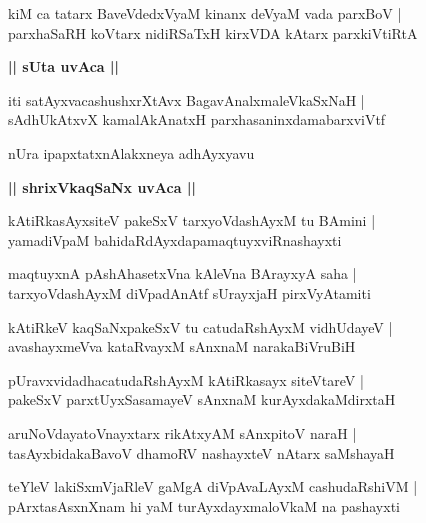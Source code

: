 \documentclass[twoside,12pt,openright]{book}
\newcounter{shloka}[chapter]
\def\uvaca#1{\centerline{{\large\textbf{#1}}}}
\begin{document}
\begin{shloka}%
kiM ca tatarx BaveVdedxVyaM kinanx deVyaM vada parxBoV |\\
parxhaSaRH koVtarx nidiRSaTxH kirxVDA kAtarx parxkiVtiRtA
\end{shloka}

\uvaca{|| sUta uvAca ||}

\begin{shloka}%
iti satAyxvacashushxrXtAvx BagavAnalxmaleVkaSxNaH |\\
sAdhUkAtxvX kamalAkAnatxH parxhasaninxdamabarxviVtf 
\end{shloka}

\begin{center}
nUra ipapxtatxnAlakxneya adhAyxyavu
\end{center}

\uvaca{|| shrixVkaqSaNx uvAca ||}

\begin{shloka}%
kAtiRkasAyxsiteV pakeSxV tarxyoVdashAyxM tu BAmini |\\
yamadiVpaM bahidaRdAyxdapamaqtuyxviRnashayxti
\end{shloka}

\begin{shloka}%
maqtuyxnA pAshAhasetxVna kAleVna BArayxyA saha |\\
tarxyoVdashAyxM diVpadAnAtf sUrayxjaH pirxVyAtamiti 
\end{shloka}

\begin{shloka}%
kAtiRkeV kaqSaNxpakeSxV tu catudaRshAyxM vidhUdayeV |\\
avashayxmeVva kataRvayxM sAnxnaM narakaBiVruBiH
\end{shloka}

\begin{shloka}%
pUravxvidadhacatudaRshAyxM kAtiRkasayx siteVtareV |\\
pakeSxV parxtUyxSasamayeV sAnxnaM kurAyxdakaMdirxtaH 
\end{shloka}

\begin{shloka}%
aruNoVdayatoVnayxtarx rikAtxyAM sAnxpitoV naraH |\\
tasAyxbidakaBavoV dhamoRV nashayxteV nAtarx saMshayaH 
\end{shloka}

\begin{shloka}%
teYleV lakiSxmVjaRleV gaMgA diVpAvaLAyxM cashudaRshiVM |\\
pArxtasAsxnXnam hi yaM turAyxdayxmaloVkaM na pashayxti 
\end{shloka}
\end{document}

